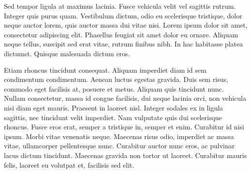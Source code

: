 Sed tempor ligula at maximus lacinia. Fusce vehicula velit vel sagittis rutrum. Integer quis purus quam. Vestibulum dictum, odio eu scelerisque tristique, dolor neque auctor lorem, quis auctor massa dui vitae nisi. Lorem ipsum dolor sit amet, consectetur adipiscing elit. Phasellus feugiat sit amet dolor eu ornare. Aliquam neque tellus, suscipit sed erat vitae, rutrum finibus nibh. In hac habitasse platea dictumst. Quisque malesuada dictum eros.

Etiam rhoncus tincidunt consequat. Aliquam imperdiet diam id sem condimentum condimentum. Aenean luctus egestas gravida. Duis sem risus, commodo eget facilisis at, posuere et metus. Aliquam quis tincidunt nunc. Nullam consectetur, massa id congue facilisis, dui neque lacinia orci, non vehicula nisi diam eget mauris. Praesent in laoreet nisl. Integer sodales ex in ligula sagittis, nec tincidunt velit imperdiet. Nam vulputate quis dui scelerisque rhoncus. Fusce eros erat, semper a tristique in, semper et enim. Curabitur id nisi ipsum. Morbi vitae venenatis neque. Maecenas risus odio, imperdiet ac massa vitae, ullamcorper pellentesque nunc. Curabitur auctor nunc eros, ac pulvinar lacus dictum tincidunt. Maecenas gravida non tortor ut laoreet. Curabitur mauris felis, laoreet eu volutpat et, facilisis sed elit.